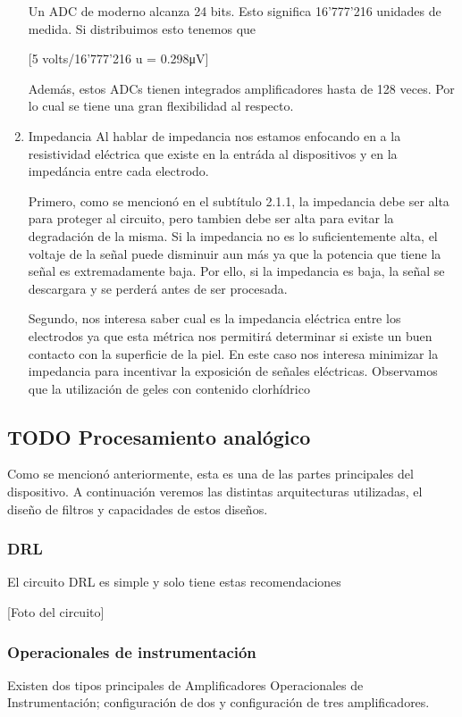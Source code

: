 \begin{enumerate}
Un ADC de moderno alcanza 24 bits. Esto significa 16’777’216 unidades de medida. Si distribuimos esto tenemos que

[5 volts/16’777’216 u = 0.298μV]

Además, estos ADCs tienen integrados amplificadores hasta de 128 veces. Por lo cual se tiene una gran flexibilidad al respecto.

\item Impedancia
\label{sec:org5dd880d}
Al hablar de impedancia nos estamos enfocando en a la resistividad eléctrica que existe en la entráda al dispositivos y en la impedáncia entre cada electrodo.

Primero, como se mencionó en el subtítulo 2.1.1, la impedancia debe ser alta para proteger al circuito, pero tambien debe ser alta para evitar la degradación de la misma. Si la impedancia no es lo suficientemente alta, el voltaje de la señal puede disminuir aun más ya que la potencia que tiene la señal es extremadamente baja. Por ello, si la impedancia es baja, la señal se descargara y se perderá antes de ser procesada.

Segundo, nos interesa saber cual es la impedancia eléctrica entre los electrodos ya que esta métrica nos permitirá determinar si existe un buen contacto con la superficie de la piel. En este caso nos interesa minimizar la impedancia para incentivar la exposición de señales eléctricas. Observamos que la utilización de geles con contenido clorhídrico
\end{enumerate}

\subsection{{\bfseries\sffamily TODO} Procesamiento analógico}
\label{sec:org01dacbe}
Como se mencionó anteriormente, esta es una de las partes principales del dispositivo. A continuación veremos las distintas arquitecturas utilizadas, el diseño de filtros y capacidades de estos diseños.

\subsubsection{DRL}
\label{sec:orgbe0d928}
El circuito DRL es simple y solo tiene estas recomendaciones 

[Foto del circuito]

\subsubsection{Operacionales de instrumentación}
\label{sec:org8f2e4ce}
Existen dos tipos principales de Amplificadores Operacionales de Instrumentación; configuración de dos y configuración de tres amplificadores.

